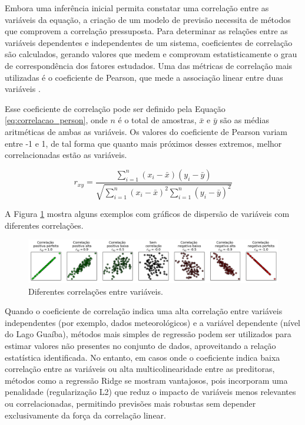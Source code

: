 Embora uma inferência inicial permita constatar uma correlação entre as variáveis da equação, a criação de um modelo de previsão necessita de métodos que comprovem a correlação pressuposta. Para determinar as relações entre as variáveis dependentes e independentes de um sistema, coeficientes de correlação são calculados, gerando valores que medem e comprovam estatisticamente o grau de correspondência dos fatores estudados. Uma das métricas de correlação mais utilizadas é o coeficiente de Pearson, que mede a associação linear entre duas variáveis \cite{kirch2008}. 

Esse coeficiente de correlação pode ser definido pela Equação \ref{eq:correlacao_person}, onde $n$ é o total de amostras, $\bar{x}$ e $\bar{y}$ são as médias aritméticas de ambas as variáveis. Os valores do coeficiente de Pearson variam entre -1 e 1, de tal forma que quanto mais próximos desses extremos, melhor correlacionadas estão as variáveis.

\begin{equation}
    r_{xy} = \frac{\sum_{i=1}^n (x_i - \bar{x})(y_i - \bar{y})}{\sqrt{\sum_{i=1}^n (x_i - \bar{x})^2 \sum_{i=1}^n (y_i - \bar{y})^2}}
    \label{eq:correlacao_person}
\end{equation}

A Figura \ref{fig:correlacoes} mostra alguns exemplos com gráficos de dispersão de variáveis com diferentes correlações.

\begin{figure}[H]
	\caption{\label{fig:correlacoes}Diferentes correlações entre variáveis.}
	\begin{center}
		\includegraphics[scale=0.4]{figuras/correlations.png}
	\end{center}
\end{figure}

Quando o coeficiente de correlação indica uma alta correlação entre variáveis independentes (por exemplo, dados meteorológicos) e a variável dependente (nível do Lago Guaíba), métodos mais simples de regressão podem ser utilizados para estimar valores não presentes no conjunto de dados, aproveitando a relação estatística identificada. No entanto, em casos onde o coeficiente indica baixa correlação entre as variáveis ou alta multicolinearidade entre as preditoras, métodos como a regressão Ridge se mostram vantajosos, pois incorporam uma penalidade (regularização L2) que reduz o impacto de variáveis menos relevantes ou correlacionadas, permitindo previsões mais robustas sem depender exclusivamente da força da correlação linear.

